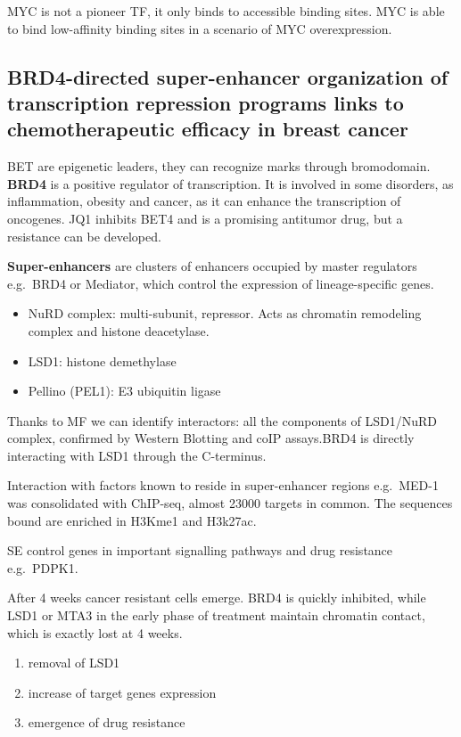 MYC is not a pioneer TF, it only binds to accessible binding sites. MYC is able to bind low-affinity binding sites in a scenario of MYC overexpression.


\subsection{BRD4-directed super-enhancer organization of transcription repression programs links to chemotherapeutic efficacy in breast cancer}

BET are epigenetic leaders, they can recognize marks through
bromodomain. \textbf{BRD4} is a positive regulator of transcription. It
is involved in some disorders, as inflammation, obesity and cancer, as
it can enhance the transcription of oncogenes. JQ1 inhibits BET4 and is
a promising antitumor drug, but a resistance can be developed.

\textbf{Super-enhancers} are clusters of enhancers occupied by master
regulators e.g.~BRD4 or Mediator, which control the expression of
lineage-specific genes.
\begin{itemize}
\tightlist
\item
  NuRD complex: multi-subunit, repressor. Acts as chromatin remodeling
  complex and histone deacetylase.
\item
  LSD1: histone demethylase
\item
  Pellino (PEL1): E3 ubiquitin ligase
\end{itemize}

Thanks to MF we can identify interactors: all the components of LSD1/NuRD complex, confirmed
by Western Blotting and coIP assays.BRD4 is directly interacting with LSD1 through the C-terminus.

Interaction with factors known to reside in super-enhancer regions
e.g.~MED-1 was consolidated with ChIP-seq, almost 23000 targets in common.
The sequences bound are enriched in H3Kme1 and H3k27ac.

SE control genes in important signalling pathways and drug resistance e.g.~PDPK1.

After 4 weeks cancer resistant cells emerge. BRD4 is quickly inhibited,
while LSD1 or MTA3 in the early phase of treatment maintain chromatin
contact, which is exactly lost at 4 weeks.
\begin{enumerate}
\tightlist
\item
  removal of LSD1
\item
  increase of target genes expression
\item
  emergence of drug resistance
\end{enumerate}

